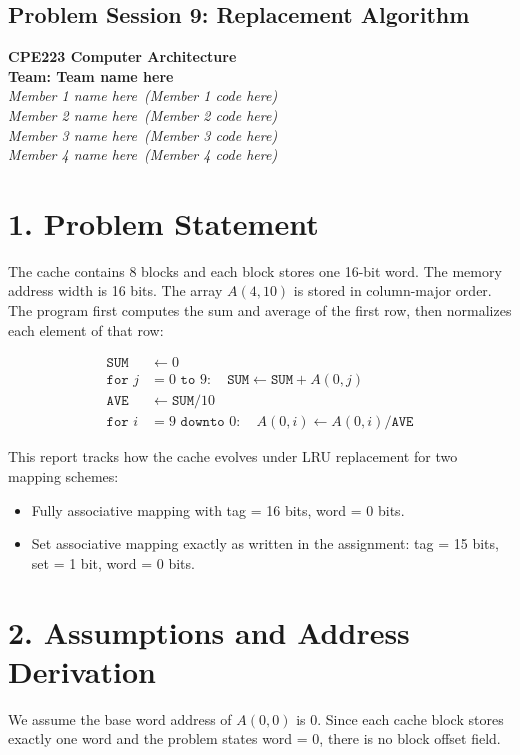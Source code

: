 \documentclass{article}
\newcommand{\TeamName}{Team name here}
\newcommand{\MemberOne}{Member 1 name here}
\newcommand{\MemberOneCode}{Member 1 code here}
\newcommand{\MemberTwo}{Member 2 name here}
\newcommand{\MemberTwoCode}{Member 2 code here}
\newcommand{\MemberThree}{Member 3 name here}
\newcommand{\MemberThreeCode}{Member 3 code here}
\newcommand{\MemberFour}{Member 4 name here}
\newcommand{\MemberFourCode}{Member 4 code here}
\begin{document}
\begin{center}
\section*{Problem Session 9: Replacement Algorithm}
\textbf{CPE223 Computer Architecture}\\
\textbf{Team: \TeamName}\\
\textit{\MemberOne\ (\MemberOneCode)}\\
\textit{\MemberTwo\ (\MemberTwoCode)}\\
\textit{\MemberThree\ (\MemberThreeCode)}\\
\textit{\MemberFour\ (\MemberFourCode)}
\end{center}

\section*{1. Problem Statement}
The cache contains 8 blocks and each block stores one 16-bit word. The memory address width is 16 bits. The array $A(4,10)$ is stored in column-major order. The program first computes the sum and average of the first row, then normalizes each element of that row:

\begin{align*}
\texttt{SUM} &\leftarrow 0 \\
\texttt{for } j &= 0 \texttt{ to } 9: \quad \texttt{SUM} \leftarrow \texttt{SUM} + A(0,j) \\
\texttt{AVE} &\leftarrow \texttt{SUM}/10 \\
\texttt{for } i &= 9 \texttt{ downto } 0: \quad A(0,i) \leftarrow A(0,i) / \texttt{AVE}
\end{align*}

This report tracks how the cache evolves under LRU replacement for two mapping schemes:
\begin{itemize}
    \item Fully associative mapping with tag = 16 bits, word = 0 bits.
    \item Set associative mapping exactly as written in the assignment: tag = 15 bits, set = 1 bit, word = 0 bits.
\end{itemize}

\section*{2. Assumptions and Address Derivation}
We assume the base word address of $A(0,0)$ is 0. Since each cache block stores exactly one word and the problem states word = 0, there is no block offset field.
\end{document}
